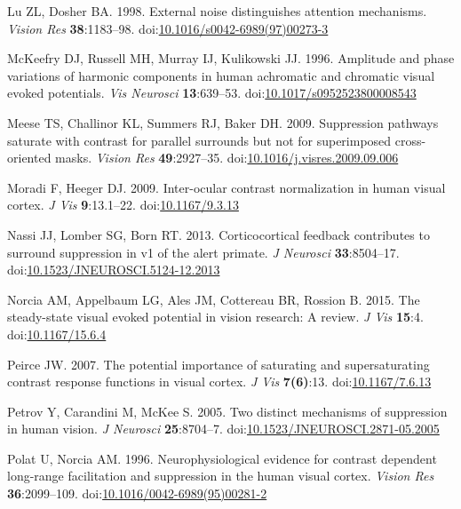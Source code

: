 \documentclass[]{article}
\begin{document}
\leavevmode\hypertarget{ref-Lu1998}{}%
Lu ZL, Dosher BA. 1998. External noise distinguishes attention mechanisms. \emph{Vision Res} \textbf{38}:1183--98. doi:\href{https://doi.org/10.1016/s0042-6989(97)00273-3}{10.1016/s0042-6989(97)00273-3}

\leavevmode\hypertarget{ref-McKeefry1996}{}%
McKeefry DJ, Russell MH, Murray IJ, Kulikowski JJ. 1996. Amplitude and phase variations of harmonic components in human achromatic and chromatic visual evoked potentials. \emph{Vis Neurosci} \textbf{13}:639--53. doi:\href{https://doi.org/10.1017/s0952523800008543}{10.1017/s0952523800008543}

\leavevmode\hypertarget{ref-Meese2009}{}%
Meese TS, Challinor KL, Summers RJ, Baker DH. 2009. Suppression pathways saturate with contrast for parallel surrounds but not for superimposed cross-oriented masks. \emph{Vision Res} \textbf{49}:2927--35. doi:\href{https://doi.org/10.1016/j.visres.2009.09.006}{10.1016/j.visres.2009.09.006}

\leavevmode\hypertarget{ref-Moradi2009}{}%
Moradi F, Heeger DJ. 2009. Inter-ocular contrast normalization in human visual cortex. \emph{J Vis} \textbf{9}:13.1--22. doi:\href{https://doi.org/10.1167/9.3.13}{10.1167/9.3.13}

\leavevmode\hypertarget{ref-Nassi2013}{}%
Nassi JJ, Lomber SG, Born RT. 2013. Corticocortical feedback contributes to surround suppression in v1 of the alert primate. \emph{J Neurosci} \textbf{33}:8504--17. doi:\href{https://doi.org/10.1523/JNEUROSCI.5124-12.2013}{10.1523/JNEUROSCI.5124-12.2013}

\leavevmode\hypertarget{ref-Norcia2015}{}%
Norcia AM, Appelbaum LG, Ales JM, Cottereau BR, Rossion B. 2015. The steady-state visual evoked potential in vision research: A review. \emph{J Vis} \textbf{15}:4. doi:\href{https://doi.org/10.1167/15.6.4}{10.1167/15.6.4}

\leavevmode\hypertarget{ref-Peirce2007}{}%
Peirce JW. 2007. The potential importance of saturating and supersaturating contrast response functions in visual cortex. \emph{J Vis} \textbf{7(6)}:13. doi:\href{https://doi.org/10.1167/7.6.13}{10.1167/7.6.13}

\leavevmode\hypertarget{ref-Petrov2005}{}%
Petrov Y, Carandini M, McKee S. 2005. Two distinct mechanisms of suppression in human vision. \emph{J Neurosci} \textbf{25}:8704--7. doi:\href{https://doi.org/10.1523/JNEUROSCI.2871-05.2005}{10.1523/JNEUROSCI.2871-05.2005}

\leavevmode\hypertarget{ref-Polat1996}{}%
Polat U, Norcia AM. 1996. Neurophysiological evidence for contrast dependent long-range facilitation and suppression in the human visual cortex. \emph{Vision Res} \textbf{36}:2099--109. doi:\href{https://doi.org/10.1016/0042-6989(95)00281-2}{10.1016/0042-6989(95)00281-2}
\end{document}

